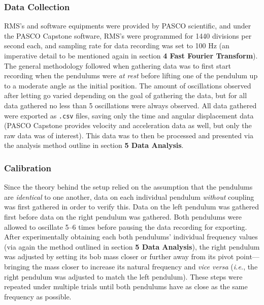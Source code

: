 \documentclass[12pt]{article}
\begin{document}
\begin{multicols}{2}
\subsubsection{Data Collection}
RMS's and software equipments were provided by PASCO scientific, and under the PASCO Capstone software, RMS's were programmed for 1440 divisions per second each,
and sampling rate for data recording was set to 100 Hz (an imperative detail to be mentioned again in section \textbf{4 Fast Fourier Transform}).
The general methodology followed when gathering data was to first start recording when the pendulums were \textit{at rest} before lifting one of the pendulum up to a moderate angle as the initial position.
The amount of oscillations observed after letting go varied depending on the goal of gathering the data, but for all data gathered no less than 5 oscillations were always observed.
All data gathered were exported as \texttt{.csv} files, saving only the time and angular displacement data (PASCO Capstone provides velocity and acceleration data as well, but only the raw data was of interest).
This data was to then be processed and presented via the analysis method outline in section \textbf{5 Data Analysis}.

\subsubsection{Calibration}
Since the theory behind the setup relied on the assumption that the pendulums are \textit{identical} to one another,
data on each individual pendulum \textit{without} coupling was first gathered in order to verify this.
Data on the left pendulum was gathered first before data on the right pendulum was gathered.
Both pendulums were allowed to oscillate 5--6 times before pausing the data recording for exporting.
After experimentally obtaining each both pendulums' individual frequency values (via again the method outlined in section \textbf{5 Data Analysis}),
the right pendulum was adjusted by setting its bob mass closer or further away from its pivot point---
bringing the mass closer to increase its natural frequency and \textit{vice versa} (\textit{i.e.}, the right pendulum was adjusted to match the left pendulum).
These steps were repeated under multiple trials until both pendulums have as close as the same frequency as possible.


\end{multicols}
\end{document}
